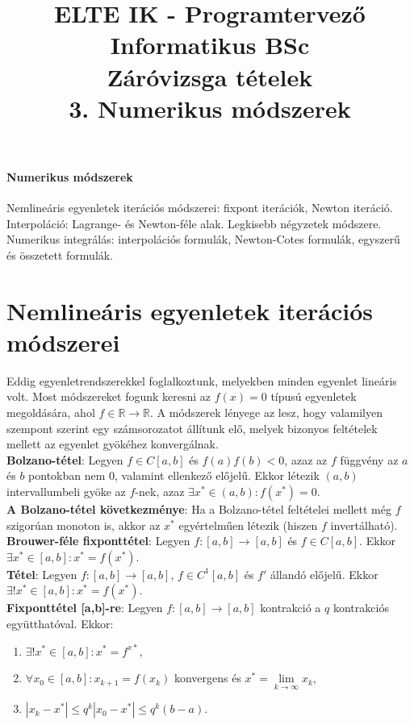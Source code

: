 \documentclass[margin=0px]{article}
\title{\textbf{{\Large ELTE IK - Programtervező Informatikus BSc} \vspace{0.2cm} \\ {\huge Záróvizsga tételek}} \vspace{0.3cm} \\ 3. Numerikus módszerek}
\author{}
\date{}
\newenvironment{tetel}[1]{\paragraph{#1 \\}}{}
\begin{document}
\maketitle

\begin{tetel}{Numerikus módszerek}
    Nemlineáris egyenletek iterációs módszerei: fixpont iterációk, Newton iteráció. Interpoláció: Lagrange- és Newton-féle alak. Legkisebb négyzetek módszere. Numerikus integrálás: interpolációs formulák, Newton-Cotes formulák, egyszerű és összetett formulák.
\end{tetel}

\section{Nemlineáris egyenletek iterációs módszerei}

Eddig egyenletrendszerekkel foglalkoztunk, melyekben minden egyenlet lineáris volt. Most módszereket
fogunk keresni az $f(x) = 0$ típusú egyenletek megoldására, ahol $f \in \mathbb{R} \to \mathbb{R}$. A módszerek
lényege az lesz, hogy valamilyen szempont szerint egy számsorozatot állítunk elő, melyek bizonyos
feltételek mellett az egyenlet gyökéhez konvergálnak.\\

\noindent \textbf{Bolzano-tétel}: Legyen $f \in C[a,b]$ és $f(a)f(b) <0$, azaz az $f$ függvény az $a$ és $b$
pontokban nem $0$, valamint ellenkező előjelű. Ekkor létezik $(a,b)$ intervallumbeli gyöke az $f$-nek, azaz
$\exists x^{*} \in (a,b): f(x^{*}) = 0$.\\

\noindent \textbf{A Bolzano-tétel következménye}: Ha a Bolzano-tétel feltételei mellett még $f$ szigorúan monoton is, akkor
az $x^{*}$ egyértelműen létezik (hiszen $f$ invertálható).\\

\noindent \textbf{Brouwer-féle fixponttétel}: Legyen $f : [a,b] \to [a,b]$ és $f \in C[a,b]$. Ekkor $\exists
    x^{*} \in [a,b]: x^{*} = f(x^{*})$.\\

\noindent \textbf{Tétel}: Legyen $f : [a,b] \to [a,b]$, $f \in C^{1}[a,b]$ és $f'$ állandó előjelű. Ekkor $\exists!
    x^{*} \in [a,b]: x^{*} = f(x^{*})$.\\

\noindent \textbf{Fixponttétel [a,b]-re}: Legyen $f : [a,b] \to [a,b]$ kontrakció a $q$ kontrakciós együtthatóval.
Ekkor:

\begin{enumerate}
    \item	$\exists! x^{*} \in [a,b]: x^{*} = f^{x*}$,

    \item	$\forall x_{0} \in [a,b]: x_{k+1} = f(x_{k})$ konvergens és $x^{*} = \lim\limits_{k \to \infty} x_{k}$,

    \item	$| x_{k} - x^{*} | \leq q^{k} | x_{0} - x^{*}| \leq q^{k}(b-a)$.
\end{enumerate}
\end{document}
